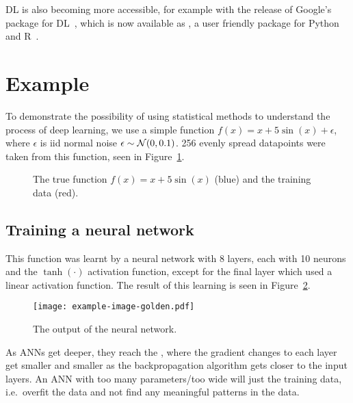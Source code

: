\ac{DL} is also becoming more accessible, for example with the release of Google's  package for \ac{DL}~\autocite{abadi2016}, which is now available as , a user friendly package for Python~\autocite{chollet2015} and R~\autocite{allaire2018}.

\section{Example}

To demonstrate the possibility of using statistical methods to understand the process of deep learning, we use a simple function \(f(x) = x + 5 \sin(x) + \epsilon\), where \(\epsilon\) is iid normal noise \(\epsilon \sim \mathcal{N}(0, 0.1)\).
256 evenly spread datapoints were taken from this function, seen in Figure~\ref{fig:sin-x-dataset}. 

\begin{figure}[htbp]
	\centering
	
	\caption{The true function \(f(x) = x + 5 \sin(x)\) (blue) and the training data (red).}
	\label{fig:sin-x-dataset}
\end{figure}


\subsection{Training a neural network}

This function was learnt by a neural network with 8 layers, each with 10 neurons and the \(\tanh(\cdot)\) activation function, except for the final layer which used a linear activation function.
The result of this learning is seen in Figure~\ref{fig:ann-output}.

\begin{figure}[htbp]
	\centering
	\texttt{[image: example-image-golden.pdf]}
	\caption{The output of the neural network.}
	\label{fig:ann-output}
\end{figure}

As \acp{ANN} get deeper, they reach the , where the gradient changes to each layer get smaller and smaller as the backpropagation algorithm gets closer to the input layers.
An \ac{ANN} with too many parameters/too wide will just  the training data, i.e.\ overfit the data and not find any meaningful patterns in the data.

